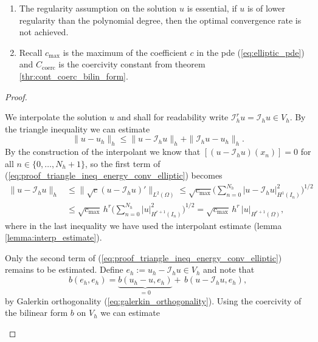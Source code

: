 \begin{remark} 
	\begin{enumerate}
		\item The regularity assumption on the solution $u$ is essential, if $u$ is of lower regularity than the polynomial degree, then the optimal convergence rate is not achieved. 
		\item Recall $c_{\max}$ is the maximum of the coefficient $c$ in the pde (\ref{eq:elliptic_pde}) and $C_{\text{coerc}}$ is the coercivity constant from theorem \ref{thr:cont_coerc_bilin_form}.
	\end{enumerate}
\end{remark}
\begin{proof}
	\begin{proofstep}
		We interpolate the solution $u$ and shall for readability write $\mathcal{I}_h^r u = \mathcal{I}_h u \in V_h$. By the triangle inequality we can estimate
		\begin{equation}
			\label{eq:proof_triangle_ineq_energy_conv_elliptic}
			\| u - u_h \|_h \leq \|u - \mathcal{I}_h u \|_h + \|\mathcal{I}_h u - u_h \|_h.
		\end{equation}
		By the construction of the interpolant we know that $[ (u- \mathcal{I}_h u)(x_n)] = 0$ for all $n\in \{0,\ldots,N_h+1\}$, so the first term of 
		(\ref{eq:proof_triangle_ineq_energy_conv_elliptic}) becomes
		\begin{align}
			\|u - \mathcal{I}_h u \|_h &\leq \|\sqrt{c}(u - \mathcal{I}_h u)' \|_{L^2(\Omega)} \leq \sqrt{c_{\max}} \Big( \sum_{n=0}^{N_h} |u - \mathcal{I}_h u|_{H^1(I_n)}^2 \Big)^{1/2} \nonumber \\
			&\leq \sqrt{c_{\max}}\, h^{r} \Big( \sum_{n=0}^{N_h} |u |_{H^{r+1}(I_n)}^2 \Big)^{1/2} = \sqrt{c_{\max}}\, h^{r} \, |u |_{H^{r+1}(\Omega)}, \label{eq:proof_elliptic_energy_conv_first_term}
		\end{align}
		where in the last inequality we have used the interpolant estimate (lemma \ref{lemma:interp_estimate}).
	\end{proofstep}
	\begin{proofstep}
		Only the second term of (\ref{eq:proof_triangle_ineq_energy_conv_elliptic}) remains to be estimated. Define $e_h := u_h - \mathcal{I}_h u \in V_h$ and note that
		\begin{equation*}
			b(e_h, e_h) = \underbrace{b(u_h - u, e_h)}_{= 0} + \, b(u - \mathcal{I}_h u, e_h),
		\end{equation*}
		by Galerkin orthogonality (\ref{eq:galerkin_orthogonality}). Using the coercivity of the bilinear form $b$ on $V_h$ we can estimate 

\end{proofstep}
\end{proof}
